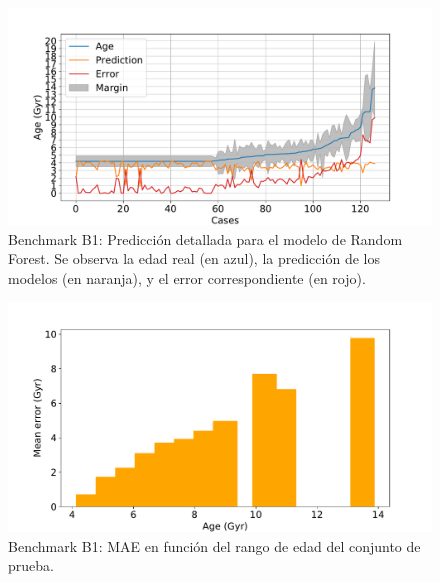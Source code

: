 \begin{figure}[H]
\begin{center}
 \includegraphics[width=0.8\linewidth]{Figuras/Experimentos/B_B1_rf_2.pdf}
\end{center}
\caption{Benchmark B1: Predicción detallada para el modelo de Random Forest. Se observa la edad real (en azul), la predicción de los modelos (en naranja), y el error correspondiente (en rojo).}
 \label{fig:benchB1_details_rf_2}
\end{figure}

\begin{figure}[H]
\begin{center}
 \includegraphics[width=0.8\linewidth]{Figuras/Experimentos/B_B1_rf_3.pdf}
\end{center}
\caption{Benchmark B1: MAE en función del rango de edad del conjunto de prueba.}
 \label{fig:benchB1_details_rf_3}
\end{figure}

